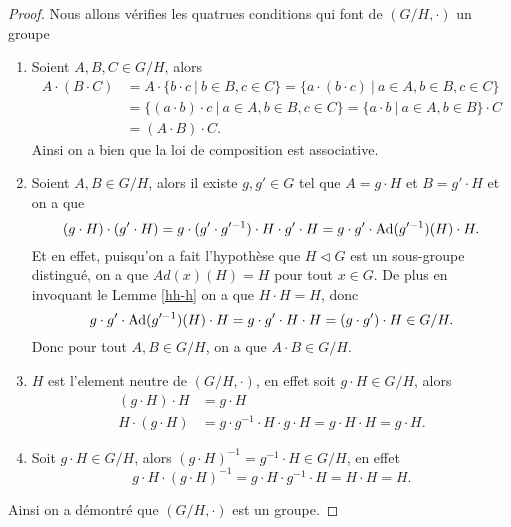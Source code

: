 \begin{proof}
	Nous allons vérifies les quatrues conditions qui font de $(G/H, \cdot)$ un groupe
	\begin{enumerate}
		\item Soient $A, B, C \in G/H$, alors
			\begin{align*}
				A \cdot (B \cdot C) &= A \cdot \{b \cdot c\ |\ b \in B, c \in C\}
					= \{a \cdot (b \cdot c)\ |\ a \in A, b \in B, c \in C\}\\
				&= \{(a \cdot b) \cdot c\ |\ a \in A, b \in B, c \in C\}
					= \{a \cdot b\ |\ a \in A, b \in B\} \cdot C\\
				&= (A \cdot B) \cdot C.
			\end{align*}
			Ainsi on a bien que la loi de composition est associative.
		\item Soient $A, B \in G/H$, alors il existe $g, g' \in G$ tel que $A = g \cdot H$ et
			$B = g' \cdot H$ et on a que	
			\begin{equation*}
				(g \cdot H) \cdot (g' \cdot H)
				= g \cdot (g' \cdot g'^{-1}) \cdot H \cdot g' \cdot H
				= g \cdot g' \cdot \operatorname{Ad}(g'^{-1})(H) \cdot H.
			\end{equation*}
			Et en effet, puisqu'on a fait l'hypothèse que $H \triangleleft G$
			est un sous-groupe distingué,
			on a que ${Ad(x)(H) = H}$ pour tout $x \in G$.
			De plus en invoquant le Lemme \ref{hh-h} on a que $H \cdot H = H$, donc
			\begin{equation*}
				g \cdot g' \cdot \operatorname{Ad}(g'^{-1})(H) \cdot H = g \cdot g' \cdot H \cdot H
				= (g \cdot g') \cdot H \in G/H.
			\end{equation*}
			Donc pour tout $A, B \in G/H$, on a que $A \cdot B \in G/H$.
		\item $H$ est l'element neutre de $(G/H, \cdot)$,
			en effet soit $g \cdot H \in G/H$, alors 
			\begin{align*}
				(g \cdot H) \cdot H &= g \cdot H\\
				H \cdot (g \cdot H) &= g \cdot g^{-1} \cdot H \cdot g \cdot H
				= g \cdot H \cdot H = g \cdot H.
			\end{align*}
		\item Soit $g \cdot H \in G/H$, alors $(g \cdot H)^{-1} = g^{-1} \cdot H \in G/H$,
			en effet
			\begin{equation*}
				g \cdot H \cdot (g \cdot H)^{-1} = g \cdot H \cdot g^{-1} \cdot H
				= H \cdot H = H.
			\end{equation*}
	\end{enumerate}
	Ainsi on a démontré que $(G/H, \cdot)$ est un groupe.
\end{proof}

